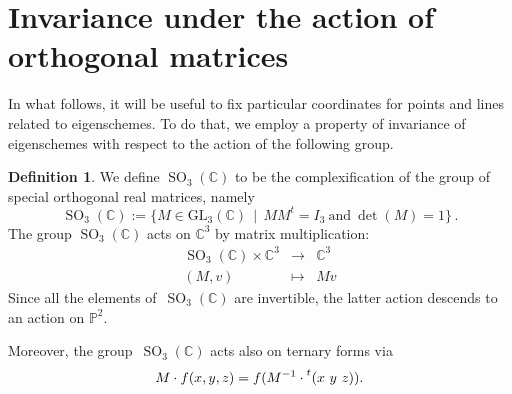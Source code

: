 \documentclass[a4paper, 11pt, reqno]{amsart}
\theoremstyle{plain}
\theoremstyle{definition}
\newtheorem{definition}[lemma]{Definition}
\newcommand{\C}{\mathbb{C}}
\newcommand{\p}{\mathbb{P}}
\newcommand{\SO}{\operatorname{SO}}
\begin{document}
\section{Invariance under the action of orthogonal matrices}
\label{invariance}

In what follows, it will be useful to fix particular coordinates for points and lines related to eigenschemes.
To do that, we employ a property of invariance of eigenschemes with respect to the action of the following group.

\begin{definition}
We define $\SO_3(\C)$ to be the complexification of the group of special orthogonal real matrices, namely
%
\[
  \SO_3(\C) :=
  \bigl\{
    M \in \mathrm{GL}_3(\C) \, \mid \,
    M M^t = I_3 \ \text{and} \ \det(M) = 1
  \bigr\} \,.
\]
%
The group $\SO_3(\C)$ acts on $\C^3$ by matrix multiplication:
%
\[
  \begin{array}{ccc}
    \SO_3(\C) \times \C^3 & \rightarrow & \C^3 \\
    (M, v) & \mapsto & Mv
  \end{array}
\]
%
Since all the elements of~$\SO_3(\C)$ are invertible, the latter action descends to an action on $\p^2$.

Moreover, the group~$\SO_3(\C)$ acts also on ternary forms via
%
\[
  M \cdot f (x,y,z) = f(M^{-1} \cdot \prescript{t} {}( x \ y \ z ) ).
\]
%
\end{definition}
\end{document}
